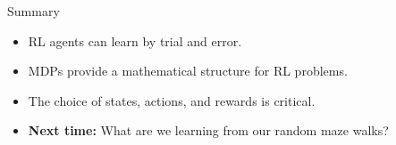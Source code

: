 \documentclass[9pt]{beamer}
\newcommand\lspace{\addtolength{\itemsep}{0.5\baselineskip}}
\begin{document}
\begin{frame}{Summary}

\begin{itemize}\lspace
	\item RL agents can learn by trial and error.
	\item MDPs provide a mathematical structure for RL problems.
	\item The choice of states, actions, and rewards is critical.
	\item<2-> \textbf{Next time:} What are we learning from our random maze walks?
\end{itemize}

\end{frame}
\end{document}
